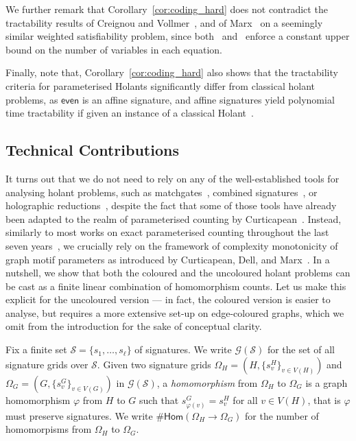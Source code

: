 \documentclass[authorcolumns,numberwithinsect]{no-lipics-v2022}
\newcommand{\homs}[2]{\mathsf{Hom}(#1 \to #2)}
\begin{document}
We further remark that Corollary~\ref{cor:coding_hard} does not contradict the tractability results of Creignou and Vollmer~\cite{CreignouV15}, and of Marx~\cite{Marx05} on a seemingly similar weighted satisfiability problem, since both~\cite{CreignouV15} and~\cite{Marx05} enforce a constant upper bound on the number of variables in each equation.

Finally, note that, Corollary~\ref{cor:coding_hard} also shows that the tractability criteria for parameterised Holants significantly differ from classical holant problems, as $\mathsf{even}$ is an affine signature, and affine signatures yield polynomial time tractability if given an instance of a classical Holant~\cite{ParityHolant13}.

\subsection{Technical Contributions}
It turns out that we do not need to rely on any of the well-established tools for analysing holant problems, such as matchgates~\cite{CaiC07}, combined signatures~\cite{CurticapeanX15}, or holographic reductions~\cite{Valiant08,CaiL11}, despite the fact that some of those tools have already been adapted to the realm of parameterised counting by Curticapean~\cite{Curticapean15}.
Instead, similarly to most works on exact parameterised counting throughout the last seven years~\cite{Roth17,DellRW19,RothSW20,BressanR21,BLR2023stoc,DoringMW24,CurticapeanN24,DoringMW25}, we crucially rely on the framework of complexity monotonicity of graph motif parameters as introduced by Curticapean, Dell, and Marx~\cite{CurticapeanDM17}. In a nutshell, we show that both the coloured and the uncoloured holant problems can be cast as a finite linear combination of homomorphism counts. Let us make this explicit for the uncoloured version --- in fact, the coloured version is easier to analyse, but requires a more extensive set-up on edge-coloured graphs, which we omit from the introduction for the sake of conceptual clarity.

Fix a finite set $\mathcal{S}=\{s_1,\dots,s_\ell\}$ of signatures. We write $\mathcal{G}(\mathcal{S})$ for the set of all signature grids over $\mathcal{S}$. Given two signature grids $\Omega_H=(H,\{s^H_v\}_{v\in V(H)})$ and $\Omega_G=(G,\{s^G_v\}_{v\in V(G)})$ in $\mathcal{G}(\mathcal{S})$, a \emph{homomorphism} from $\Omega_H$ to $\Omega_G$ is a graph homomorphism $\varphi$ from $H$ to $G$ such that $s^G_{\varphi(v)}=s^H_v$ for all $v\in V(H)$, that is $\varphi$ must preserve signatures. We write $\#\homs{\Omega_H}{\Omega_G}$ for the number of homomorpisms from $\Omega_H$ to $\Omega_G$.
\end{document}
